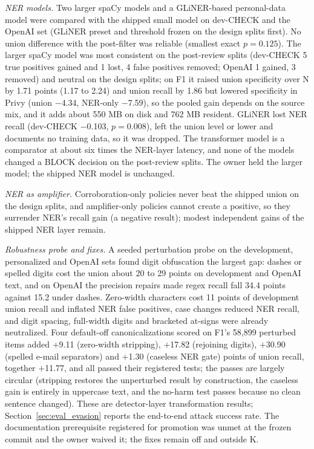 \documentclass[sigconf]{acmart}
\theoremstyle{acmdefinition}\newtheorem{property}{Property}
\begin{document}
\textit{NER models.} Two larger spaCy models and a GLiNER-based personal-data model were compared with the shipped small model on dev-CHECK and the OpenAI set (GLiNER preset and threshold frozen on the design splits first). No union difference with the post-filter was reliable (smallest exact $p=0.125$). The larger spaCy model was most consistent on the post-review splits (dev-CHECK 5 true positives gained and 1 lost, 4 false positives removed; OpenAI 1 gained, 3 removed) and neutral on the design splits; on F1 it raised union specificity over N by 1.71 points (1.17 to 2.24) and union recall by 1.86 but lowered specificity in Privy (union $-$4.34, NER-only $-$7.59), so the pooled gain depends on the source mix, and it adds about 550 MB on disk and 762 MB resident. GLiNER lost NER recall (dev-CHECK $-$0.103, $p=0.008$), left the union level or lower and documents no training data, so it was dropped. The transformer model is a comparator at about six times the NER-layer latency, and none of the models changed a BLOCK decision on the post-review splits. The owner held the larger model; the shipped NER model is unchanged.

\textit{NER as amplifier.} Corroboration-only policies never beat the shipped union on the design splits, and amplifier-only policies cannot create a positive, so they surrender NER's recall gain (a negative result); modest independent gains of the shipped NER layer remain.

\textit{Robustness probe and fixes.} A seeded perturbation probe on the development, personalized and OpenAI sets found digit obfuscation the largest gap: dashes or spelled digits cost the union about 20 to 29 points on development and OpenAI text, and on OpenAI the precision repairs made regex recall fall 34.4 points against 15.2 under dashes. Zero-width characters cost 11 points of development union recall and inflated NER false positives, case changes reduced NER recall, and digit spacing, full-width digits and bracketed at-signs were already neutralized. Four default-off canonicalizations scored on F1's 58,899 perturbed items added $+$9.11 (zero-width stripping), $+$17.82 (rejoining digits), $+$30.90 (spelled e-mail separators) and $+$1.30 (caseless NER gate) points of union recall, together $+$11.77, and all passed their registered tests; the passes are largely circular (stripping restores the unperturbed result by construction, the caseless gain is entirely in uppercase text, and the no-harm test passes because no clean sentence changed). These are detector-layer transformation results; Section~\ref{sec:eval_evasion} reports the end-to-end attack success rate. The documentation prerequisite registered for promotion was unmet at the frozen commit and the owner waived it; the fixes remain off and outside K.
\end{document}
